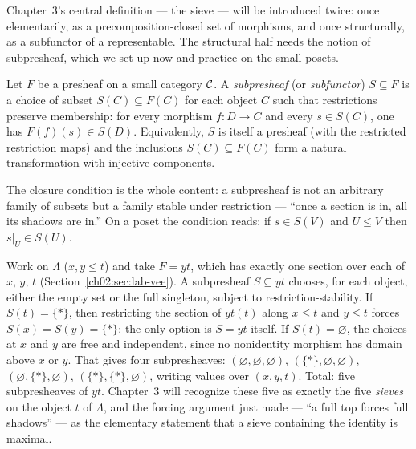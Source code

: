 Chapter~3's central definition --- the sieve --- will be introduced twice:
once elementarily, as a precomposition-closed set of morphisms, and once
structurally, as a subfunctor of a representable. The structural half needs
the notion of subpresheaf, which we set up now and practice on the small
posets.

\begin{definition}[Subpresheaf]\label{ch02:def:subpresheaf}
Let $F$ be a presheaf on a small category $\mathcal{C}$. A \emph{subpresheaf}
(or \emph{subfunctor}) $S \subseteq F$ is a choice of subset
$S(C) \subseteq F(C)$ for each object $C$ such that restrictions
preserve membership: for every morphism $f : D \to C$ and every
$s \in S(C)$, one has $F(f)(s) \in S(D)$. Equivalently, $S$ is itself a
presheaf (with the restricted restriction maps) and the inclusions
$S(C) \subseteq F(C)$ form a natural transformation with injective
components.
\end{definition}

The closure condition is the whole content: a subpresheaf is not an
arbitrary family of subsets but a family stable under restriction ---
``once a section is in, all its shadows are in.'' On a poset the
condition reads: if $s \in S(V)$ and $U \le V$ then $s|_U \in S(U)$.

\begin{example}\label{ch02:ex:subrep-vee}
Work on $\Lambda$ ($x, y \le t$) and take $F = yt$, which has exactly
one section over each of $x$, $y$, $t$
(Section~\ref{ch02:sec:lab-vee}). A subpresheaf $S \subseteq yt$
chooses, for each object, either the empty set or the full singleton,
subject to restriction-stability. If $S(t) = \{\ast\}$, then
restricting the section of $yt(t)$ along $x \le t$ and $y \le t$
forces $S(x) = S(y) = \{\ast\}$: the only option is $S = yt$ itself.
If $S(t) = \varnothing$, the choices at $x$ and $y$ are free and
independent, since no nonidentity morphism has domain above $x$ or
$y$. That gives four subpresheaves:
$(\varnothing, \varnothing, \varnothing)$,
$(\{\ast\}, \varnothing, \varnothing)$,
$(\varnothing, \{\ast\}, \varnothing)$,
$(\{\ast\}, \{\ast\}, \varnothing)$, writing values over
$(x, y, t)$. Total: five subpresheaves of $yt$. Chapter~3 will
recognize these five as exactly the five \emph{sieves} on the object
$t$ of $\Lambda$, and the forcing argument just made --- ``a full top
forces full shadows'' --- as the elementary statement that a sieve
containing the identity is maximal.
\end{example}

